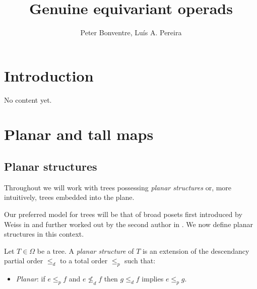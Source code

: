 \documentclass[a4paper,10pt]{article}%
\author{Peter Bonventre, Lu\'is A. Pereira}%
\title{Genuine equivariant operads}%
\begin{document}
	\maketitle%



\tableofcontents

\section{Introduction}

No content yet.



\section{Planar and tall maps}

\subsection{Planar structures}


Throughout we will work with trees possessing \textit{planar structures} or, more intuitively, trees embedded into the plane.

Our preferred model for trees will be that of broad posets first introduced by Weiss in \cite{We12} and further worked out by the second author in \cite{Pe16b}. We now define planar structures in this context.


\begin{definition}\label{PLANARIZE DEF}
	Let $T \in \Omega$ be a tree. A \textit{planar structure} of $T$ is an extension of the descendancy partial order $\leq_d$ to a total order $\leq_p$ such that: 
	\begin{itemize}
		\item \textit{Planar}: if $e \leq_p f$ and $e \nleq_d f$ then 
		$g \leq_d f$ implies $e \leq_p g$.
	\end{itemize} 
\end{definition}
\end{document}
